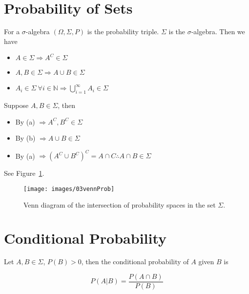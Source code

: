 \mainmatter%
\setcounter{page}{1}

\lectureseries[\course]{\course}

\date{October 6, 2009}

\setaddress%

\setcounter{lecture}{2}
\setcounter{chapter}{2}


\section{Probability of Sets}
For a $\sigma$-algebra $(\Omega, \Sigma, P)$ is the probability triple.
$\Sigma$ is the $\sigma$-algebra.
Then we have
\begin{itemize}
\item $A\in\Sigma \Rightarrow A^C\in\Sigma$
\item $A, B\in\Sigma \Rightarrow A\cup B\in\Sigma$
\item $A_i\in\Sigma~\forall i\in\mathbb{N} \Rightarrow \bigcup_{i=1}^\infty A_i\in\Sigma$
\end{itemize}
Suppose $A,B\in\Sigma$, then
\begin{itemize}
\item By (a) $\Rightarrow A^C,B^C\in\Sigma$
\item By (b) $\Rightarrow A\cup B\in\Sigma$
\item By (a) $\Rightarrow {(A^C\cup B^C)}^C = A\cap C \therefore A\cap B\in\Sigma$
\end{itemize}
See Figure~\ref{fig:03vennProb}.

\begin{figure}[ht!]
\centering
\texttt{[image: images/03vennProb]}
\caption{Venn diagram of the intersection of probability spaces in the set $\Sigma$.}%
\label{fig:03vennProb}
\end{figure}

\section{Conditional Probability}
Let $A,B\in\Sigma$, $P(B)>0$, then the conditional probability of $A$ given $B$ is

\begin{equation*}
P(A|B) = \frac{P(A\cap B)}{P(B)}
\end{equation*}

